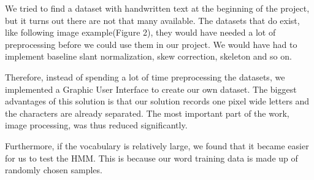 
We tried to find a dataset with handwritten text at the beginning of the project, but it turns out there are not that many available. 
The datasets that do exist, like following image example(Figure 2), they would have needed a lot of preprocessing before we could use them in our project.
We would have had to implement baseline slant normalization, skew correction, skeleton and so on.

Therefore, instead of spending a lot of time preprocessing the datasets, we implemented a Graphic User Interface to create our own dataset.
The biggest advantages of this solution is that our solution records one pixel wide letters and the characters are already separated. 
The most important part of the work, image processing, was thus reduced significantly.


Furthermore, if the vocabulary is relatively large, we found that it became easier for us to test the HMM.
This is because our word training data is made up of randomly chosen samples.


